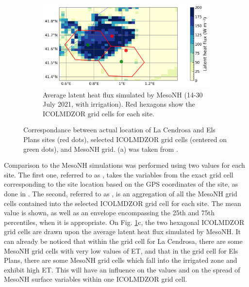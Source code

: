 \begin{figure}[hbtp]
    \begin{subfigure}[t]{0.75\textwidth}
            \caption{Average latent heat flux simulated by MesoNH (14-30 July 2021, with irrigation). Red hexagons show the ICOLMDZOR grid cells for each site.}
            \includegraphics[width=\textwidth]{images/chap5/liaise_sites_mean_mesoNH.png}
        \end{subfigure} 
    
    \caption{Correspondance between actual location of La Cendrosa and Els Plans sites (red dots), selected ICOLMDZOR grid cells (centered on green dots), and MesoNH grid. (a) was taken from \citet{lunel_irrigation_2024}.}
    \label{fig:liaise_sites_grid_cells}
\end{figure}

Comparison to the MesoNH simulations was performed using two values for each site. 
The first one, referred to as \mesoexact, takes the variables from the exact grid cell corresponding to the site location based on the GPS coordinates of the site, as done in \citet{lunel_irrigation_2024}. 
The second, referred to as \mesomean, is an aggregation of all the MesoNH grid cells contained into the selected ICOLMDZOR grid cell for each site. The mean value is shown, as well as an envelope encompassing the 25th and 75th percentiles, when it is appropriate.
On Fig. \ref{fig:liaise_sites_grid_cells}c, the two hexagonal ICOLMDZOR grid cells are drawn upon the average latent heat flux simulated by MesoNH. It can already be noticed that within the grid cell for La Cendrosa, there are some MesoNH grid cells with very low values of ET, and that in the grid cell for Els Plans, there are some MesoNH grid cells which fall into the irrigated zone and exhibit high ET. This will have an influence on the \mesomean values and on the spread of MesoNH surface variables within one ICOLMDZOR grid cell. 

